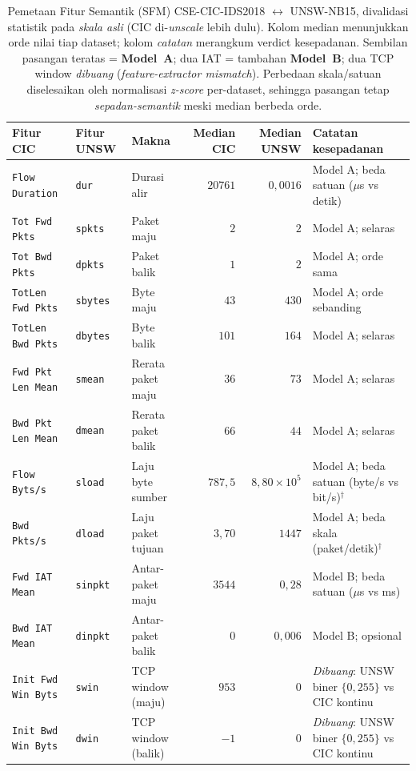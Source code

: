 \documentclass[11pt,a4paper]{article}
\begin{document}
\begin{table}[t]
\centering
\caption{Pemetaan Fitur Semantik (SFM) CSE-CIC-IDS2018 $\leftrightarrow$
UNSW-NB15, divalidasi statistik pada \emph{skala asli} (CIC di-\emph{unscale}
lebih dulu). Kolom median menunjukkan orde nilai tiap dataset; kolom
\emph{catatan} merangkum verdict kesepadanan. Sembilan pasangan teratas =
\textbf{Model~A}; dua IAT = tambahan \textbf{Model~B}; dua TCP window
\emph{dibuang} (\emph{feature-extractor mismatch}). Perbedaan skala/satuan
diselesaikan oleh normalisasi \emph{z-score} per-dataset, sehingga pasangan
tetap \emph{sepadan-semantik} meski median berbeda orde.}
\label{tab:sfm}
\small
\begin{tabular}{lllrrl}
\toprule
Fitur CIC & Fitur UNSW & Makna & Median CIC & Median UNSW & Catatan kesepadanan \\
\midrule
\texttt{Flow Duration}     & \texttt{dur}    & Durasi alir & $20761$ & $0{,}0016$ & Model A; beda satuan ($\mu$s vs detik) \\
\texttt{Tot Fwd Pkts}      & \texttt{spkts}  & Paket maju  & $2$ & $2$ & Model A; selaras \\
\texttt{Tot Bwd Pkts}      & \texttt{dpkts}  & Paket balik & $1$ & $2$ & Model A; orde sama \\
\texttt{TotLen Fwd Pkts}   & \texttt{sbytes} & Byte maju   & $43$ & $430$ & Model A; orde sebanding \\
\texttt{TotLen Bwd Pkts}   & \texttt{dbytes} & Byte balik  & $101$ & $164$ & Model A; selaras \\
\texttt{Fwd Pkt Len Mean}  & \texttt{smean}  & Rerata paket maju  & $36$ & $73$ & Model A; selaras \\
\texttt{Bwd Pkt Len Mean}  & \texttt{dmean}  & Rerata paket balik & $66$ & $44$ & Model A; selaras \\
\texttt{Flow Byts/s}       & \texttt{sload}  & Laju byte sumber & $787{,}5$ & $8{,}80{\times}10^{5}$ & Model A; beda satuan (byte/s vs bit/s)$^\dagger$ \\
\texttt{Bwd Pkts/s}        & \texttt{dload}  & Laju paket tujuan & $3{,}70$ & $1447$ & Model A; beda skala (paket/detik)$^\dagger$ \\
\midrule
\texttt{Fwd IAT Mean}      & \texttt{sinpkt} & Antar-paket maju  & $3544$ & $0{,}28$ & Model B; beda satuan ($\mu$s vs ms) \\
\texttt{Bwd IAT Mean}      & \texttt{dinpkt} & Antar-paket balik & $0$ & $0{,}006$ & Model B; opsional \\
\midrule
\texttt{Init Fwd Win Byts} & \texttt{swin}   & TCP window (maju)  & $953$ & $0$ & \emph{Dibuang}: UNSW biner $\{0,255\}$ vs CIC kontinu \\
\texttt{Init Bwd Win Byts} & \texttt{dwin}   & TCP window (balik) & $-1$ & $0$ & \emph{Dibuang}: UNSW biner $\{0,255\}$ vs CIC kontinu \\
\bottomrule
\end{tabular}


\end{table}
\end{document}
